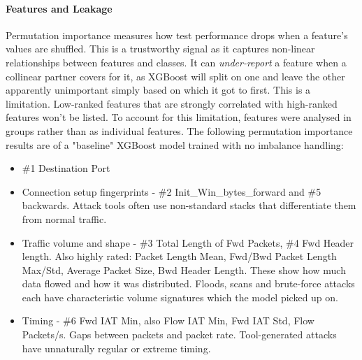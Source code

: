 \documentclass{article}
\begin{document}
\paragraph{Features and Leakage}
Permutation importance measures how test performance drops when a feature's values are shuffled. This is a trustworthy signal as it captures non-linear relationships between features and classes. It can \textit{under-report} a feature when a collinear partner covers for it, as XGBoost will split on one and leave the other apparently unimportant simply based on which it got to first. This is a limitation. Low-ranked features that are strongly correlated with high-ranked features won't be listed. To account for this limitation, features were analysed in groups rather than as individual features. The following permutation importance results are of a "baseline" XGBoost model trained with no imbalance handling:
\begin{itemize}
        \item \#1 Destination Port 
        \item Connection setup fingerprints - \#2 Init\_Win\_bytes\_forward and \#5 backwards. Attack tools often use non-standard stacks that differentiate them from normal traffic.
        \item Traffic volume and shape - \#3 Total Length of Fwd Packets, \#4 Fwd Header length. Also highly rated: Packet Length Mean, Fwd/Bwd Packet Length Max/Std, Average Packet Size, Bwd Header Length. These show how much data flowed and how it was distributed. Floods, scans and brute-force attacks each have characteristic volume signatures which the model picked up on.
          
        \item Timing - \#6 Fwd IAT Min, also Flow IAT Min, Fwd IAT Std, Flow Packets/s. Gaps between packets and packet rate. Tool-generated attacks have unnaturally regular or extreme timing.
\end{itemize}
\end{document}
